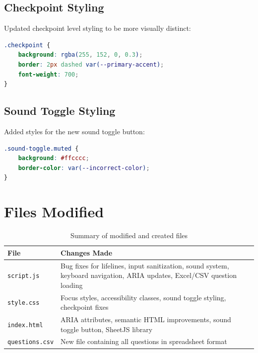 \documentclass[11pt,a4paper]{article}
\begin{document}
\subsection{Checkpoint Styling}

Updated checkpoint level styling to be more visually distinct:

\begin{lstlisting}[language=CSS]
.checkpoint {
    background: rgba(255, 152, 0, 0.3);
    border: 2px dashed var(--primary-accent);
    font-weight: 700;
}
\end{lstlisting}

\subsection{Sound Toggle Styling}

Added styles for the new sound toggle button:

\begin{lstlisting}[language=CSS]
.sound-toggle.muted {
    background: #ffcccc;
    border-color: var(--incorrect-color);
}
\end{lstlisting}

\section{Files Modified}

\begin{table}[h]
\centering
\begin{tabular}{@{}lp{10cm}@{}}
\toprule
\textbf{File} & \textbf{Changes Made} \\
\midrule
\texttt{script.js} & Bug fixes for lifelines, input sanitization, sound system, keyboard navigation, ARIA updates, Excel/CSV question loading \\
\texttt{style.css} & Focus styles, accessibility classes, sound toggle styling, checkpoint fixes \\
\texttt{index.html} & ARIA attributes, semantic HTML improvements, sound toggle button, SheetJS library \\
\texttt{questions.csv} & New file containing all questions in spreadsheet format \\
\bottomrule
\end{tabular}
\caption{Summary of modified and created files}
\end{table}
\end{document}
